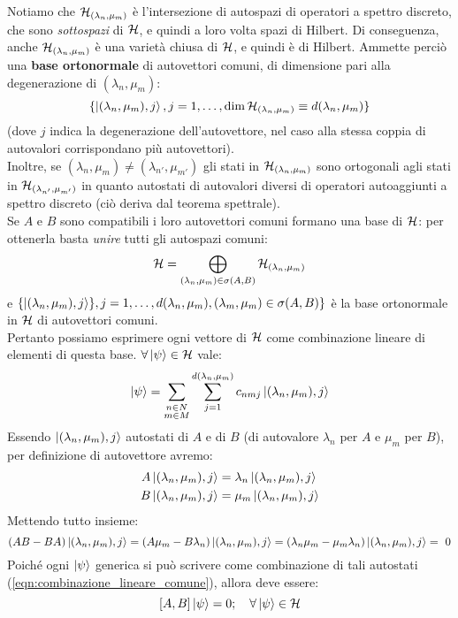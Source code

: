 \documentclass[../../FisicaTeorica.tex]{subfiles}
\begin{document}
Notiamo che $\mathcal{H}_{(\lambda_n, \mu_m)}$ è l'intersezione di autospazi di operatori a spettro discreto, che sono \textit{sottospazi} di $\mathcal{H}$, e quindi a loro volta spazi di Hilbert. Di conseguenza, anche $\mathcal{H}_{(\lambda_n, \mu_m)}$ è una varietà chiusa di $\mathcal{H}$, e quindi è di Hilbert. Ammette perciò una \textbf{base ortonormale} di autovettori comuni, di dimensione pari alla degenerazione di $(\lambda_n,\mu_m)$:
\[
\{\Ket{(\lambda_n, \mu_m), j}, j = 1, \dots, \operatorname{dim}\mathcal{H}_{(\lambda_n, \mu_m)}\equiv d(\lambda_n, \mu_m)\}
\]
(dove $j$ indica la degenerazione dell'autovettore, nel caso alla stessa coppia di autovalori corrispondano più autovettori).\\
Inoltre, se $(\lambda_n, \mu_m)\neq (\lambda_{n'}, \mu_{m'})$ gli stati in $\mathcal{H}_{(\lambda_n, \mu_m)}$ sono ortogonali agli stati in $\mathcal{H}_{(\lambda_{n'}, \mu_{m'})}$ in quanto autostati di autovalori diversi di operatori autoaggiunti a spettro discreto (ciò deriva dal teorema spettrale).\\ %
Se $A$ e $B$ sono compatibili i loro autovettori comuni formano una base di $\mathcal{H}$: per ottenerla basta \textit{unire} tutti gli autospazi comuni:
\[
\mathcal{H} = \bigoplus_{(\lambda_n, \mu_m)\in \sigma(A,B)} \mathcal{H}_{(\lambda_n, \mu_m)}
\]
e $\{\Ket{(\lambda_n, \mu_m), j}\}, j=1, \dots, d(\lambda_n, \mu_m), (\lambda_m, \mu_m)\in \sigma(A,B)\}$ è la base ortonormale in $\mathcal{H}$ di autovettori comuni.\\
Pertanto possiamo esprimere ogni vettore di $\mathcal{H}$ come combinazione lineare di elementi di questa base. $\forall \Ket{\psi}\in \mathcal{H}$ vale:
\begin{equation}
\Ket{\psi}=\sum_{\substack{n\in N\\m\in M}} \sum_{j=1}^{d(\lambda_n, \mu_m)}c_{nmj}\Ket{(\lambda_n, \mu_m),j}
\label{eqn:combinazione_lineare_comune}
\end{equation}
Essendo $\Ket{(\lambda_n, \mu_m), j}$ autostati di $A$ e di $B$ (di autovalore $\lambda_n$ per $A$ e $\mu_m$ per $B$), per definizione di autovettore avremo:
\begin{align*}
A\Ket{(\lambda_n, \mu_m),j} &= \lambda_n \Ket{(\lambda_n, \mu_m),j}\\
B\Ket{(\lambda_n, \mu_m),j} &= \mu_m \Ket{(\lambda_n,\mu_m),j}
\end{align*}
Mettendo tutto insieme:
\[
(AB-BA)\Ket{(\lambda_n, \mu_m), j} = (A\mu_m -B\lambda_n)\Ket{(\lambda_n, \mu_m),j}= (\lambda_n \mu_m - \mu_m \lambda_n)\Ket{(\lambda_n, \mu_m),j} =\ 0
\]
Poiché ogni $\Ket{\psi}$ generica si può scrivere come combinazione di tali autostati (\ref{eqn:combinazione_lineare_comune}), allora deve essere:
\[
[A,B]\Ket{\psi} = 0; \quad \forall \Ket{\psi}\in \mathcal{H}
\]
\end{document}
